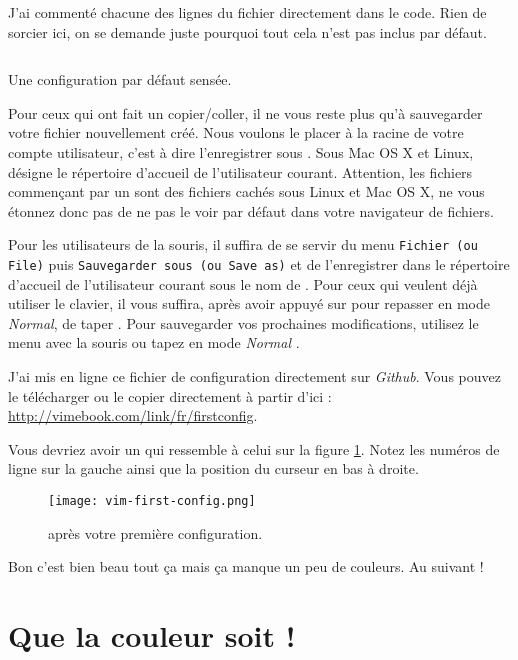 J'ai commenté chacune des lignes du fichier directement dans le code. Rien de sorcier ici, on se demande juste pourquoi tout cela n'est pas inclus par défaut.

\begin{listing}[H]
    \inputminted[bgcolor=bg, fontsize=\footnotesize]{vim}{../../vim-for-humans/firstconfig/vimrc}
    \caption{Une configuration par défaut sensée.}
    \label{code:first-config}
\end{listing}

Pour ceux qui ont fait un copier/coller, il ne vous reste plus qu'à sauvegarder votre fichier nouvellement créé. Nous voulons le placer à la racine de votre compte utilisateur, c'est à dire l'enregistrer sous . Sous Mac OS X et Linux, \hlred{\Verb|\textasciitilde{}|} désigne le répertoire d'accueil de l'utilisateur courant. Attention, les fichiers commençant par un  sont des fichiers cachés sous Linux et Mac OS X, ne vous étonnez donc pas de ne pas le voir par défaut dans votre navigateur de fichiers.

Pour les utilisateurs de la souris, il suffira de se servir du menu \Verb|Fichier (ou File)| puis \Verb|Sauvegarder sous (ou Save as)| et de l'enregistrer dans le répertoire d'accueil de l'utilisateur courant sous le nom de . Pour ceux qui veulent déjà utiliser le clavier, il vous suffira, après avoir appuyé sur \ttesc pour repasser en mode \emph{Normal}, de taper . Pour sauvegarder vos prochaines modifications, utilisez le menu avec la souris ou tapez en mode \emph{Normal} .

J'ai mis en ligne ce fichier de configuration directement sur \emph{Github}. Vous pouvez le télécharger ou le copier directement à partir d'ici : \url{http://vimebook.com/link/fr/firstconfig}.

Vous devriez avoir un \vim qui ressemble à celui sur la figure \ref{fig:first-config}. Notez les numéros de ligne sur la gauche ainsi que la position du curseur en bas à droite.

\begin{figure}%
  \texttt{[image: vim-first-config.png]}
  \caption{\vim après votre première configuration.}
  \label{fig:first-config}
\end{figure}

Bon c'est bien beau tout ça mais ça manque un peu de couleurs. Au suivant !

\section{Que la couleur soit !}

